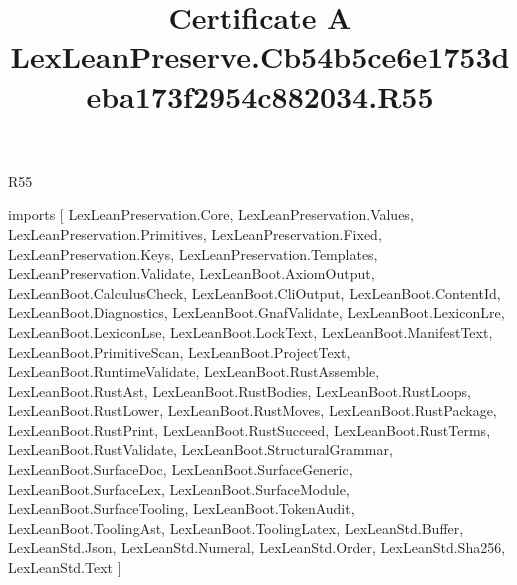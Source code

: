 \begin{lexlean}{R55}
\title{Certificate A LexLeanPreserve.Cb54b5ce6e1753deba173f2954c882034.R55}
\begin{coremodule}
imports [
  LexLeanPreservation.Core,
  LexLeanPreservation.Values,
  LexLeanPreservation.Primitives,
  LexLeanPreservation.Fixed,
  LexLeanPreservation.Keys,
  LexLeanPreservation.Templates,
  LexLeanPreservation.Validate,
  LexLeanBoot.AxiomOutput,
  LexLeanBoot.CalculusCheck,
  LexLeanBoot.CliOutput,
  LexLeanBoot.ContentId,
  LexLeanBoot.Diagnostics,
  LexLeanBoot.GnafValidate,
  LexLeanBoot.LexiconLre,
  LexLeanBoot.LexiconLse,
  LexLeanBoot.LockText,
  LexLeanBoot.ManifestText,
  LexLeanBoot.PrimitiveScan,
  LexLeanBoot.ProjectText,
  LexLeanBoot.RuntimeValidate,
  LexLeanBoot.RustAssemble,
  LexLeanBoot.RustAst,
  LexLeanBoot.RustBodies,
  LexLeanBoot.RustLoops,
  LexLeanBoot.RustLower,
  LexLeanBoot.RustMoves,
  LexLeanBoot.RustPackage,
  LexLeanBoot.RustPrint,
  LexLeanBoot.RustSucceed,
  LexLeanBoot.RustTerms,
  LexLeanBoot.RustValidate,
  LexLeanBoot.StructuralGrammar,
  LexLeanBoot.SurfaceDoc,
  LexLeanBoot.SurfaceGeneric,
  LexLeanBoot.SurfaceLex,
  LexLeanBoot.SurfaceModule,
  LexLeanBoot.SurfaceTooling,
  LexLeanBoot.TokenAudit,
  LexLeanBoot.ToolingAst,
  LexLeanBoot.ToolingLatex,
  LexLeanStd.Buffer,
  LexLeanStd.Json,
  LexLeanStd.Numeral,
  LexLeanStd.Order,
  LexLeanStd.Sha256,
  LexLeanStd.Text
]


\end{coremodule}
\end{lexlean}
